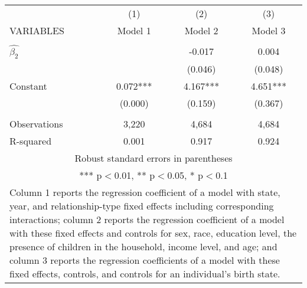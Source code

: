 \begin{tabular}{lccc} 
\hline
 & (1) & (2) & (3) \\
VARIABLES & Model 1 & Model 2 & Model 3 \\ \hline
 &  &  &  \\
$\hat{\beta_2}$ &  & -0.017 & 0.004 \\
 &  & (0.046) & (0.048) \\
Constant & 0.072*** & 4.167*** & 4.651*** \\
 & (0.000) & (0.159) & (0.367) \\
 &  &  &  \\
Observations & 3,220 & 4,684 & 4,684 \\
 R-squared & 0.001 & 0.917 & 0.924 \\ \hline
\multicolumn{4}{c}{ Robust standard errors in parentheses} \\
\multicolumn{4}{c}{ *** p$<$0.01, ** p$<$0.05, * p$<$0.1} \\
\multicolumn{4}{p{0.6\linewidth}}{\footnotesize Column 1 reports the regression coefficient of a model with state, year, and relationship-type fixed effects including corresponding interactions; column 2 reports the regression coefficient of a model with these fixed effects and controls for sex, race, education level, the presence of children in the household, income level, and age; and column 3 reports the regression coefficients of a model with these fixed effects, controls, and controls for an individual’s birth state.} \\
\end{tabular}
